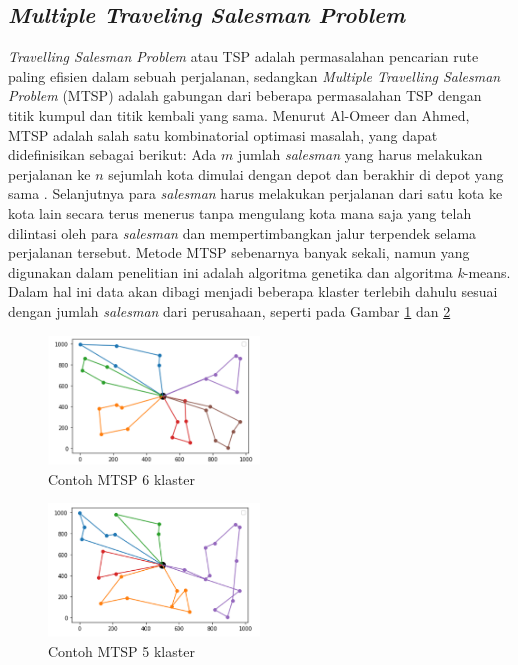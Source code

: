 \subsection{\textit{Multiple Traveling Salesman Problem}}

\textit{Travelling Salesman Problem} atau TSP adalah permasalahan pencarian rute paling efisien dalam sebuah perjalanan, sedangkan \textit{Multiple Travelling Salesman Problem} (MTSP) adalah gabungan dari beberapa permasalahan TSP dengan titik kumpul dan titik kembali yang sama. Menurut Al-Omeer dan Ahmed, MTSP adalah salah satu kombinatorial optimasi masalah, yang dapat didefinisikan sebagai berikut: Ada $m$ jumlah \textit{salesman} yang harus melakukan perjalanan ke $n$ sejumlah kota dimulai dengan depot dan berakhir di depot yang sama \cite{al2019comparative}. Selanjutnya para \textit{salesman} harus melakukan perjalanan dari satu kota ke kota lain secara terus menerus tanpa mengulang kota mana saja yang telah dilintasi oleh para \textit{salesman} dan mempertimbangkan jalur terpendek selama perjalanan tersebut. Metode MTSP sebenarnya banyak sekali, namun yang digunakan dalam penelitian ini adalah algoritma genetika dan algoritma \textit{k}-means. Dalam hal ini data akan dibagi menjadi beberapa klaster terlebih dahulu sesuai dengan jumlah \textit{salesman} dari perusahaan, seperti pada Gambar \ref{fig:mtsp6} dan \ref{fig:mtsp5}

\begin{figure}[H]
  \centering
  \includegraphics[width=0.5\textwidth]{Gambar/Picture1.png}
  \caption{Contoh MTSP 6 klaster}
  \label{fig:mtsp6}
\end{figure}

\begin{figure}[H]
  \centering
  \includegraphics[width=0.5\textwidth]{Gambar/Picture2.png}
  \caption{Contoh MTSP 5 klaster}
  \label{fig:mtsp5}
\end{figure}

